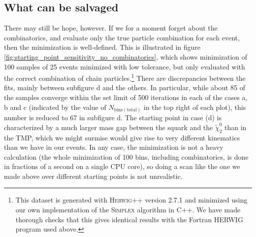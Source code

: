 \documentclass[twoside,english]{uiofysmaster}
\begin{document}




\subsection{What can be salvaged}

There may still be hope, however. If we for a moment forget about the combinatorics, and evaluate only the true particle combination for each event, then the minimization is well-defined. This is illustrated in figure \ref{fig:starting_point_sensitivity_no_combinatorics}, which shows minimization of 100 samples of 25 events minimized with low tolerance, but only evaluated with the correct combination of chain particles.\footnote{This dataset is generated with {\scshape Herwig++} version 2.7.1 \cite{Bahr:2008pv} and minimized using our own implementation of the {\scshape Simplex} algorithm in C++. We have made thorough checks that this gives identical results with the Fortran {\scshape HERWIG} program used above.} There are discrepancies between the fits, mainly between subfigure d and the others. In particular, while about 85 of the samples converge within the set limit of 500 iterations in each of the cases a, b and c (indicated by the value of $N_\mathrm{bins(total)}$ in the top right of each plot), this number is reduced to 67 in subfigure d. The starting point in case (d) is characterized by a much larger mass gap between the squark and the $\tilde\chi_2^0$ than in the TMP, which we might surmise would give rise to very different kinematics than we have in our events. In any case, the minimization is not a heavy calculation (the whole minimization of 100 bins, including combinatorics, is done in fractions of a second on a single CPU core), so doing a scan like the one we made above over different starting points is not unrealistic. 


\end{document}
